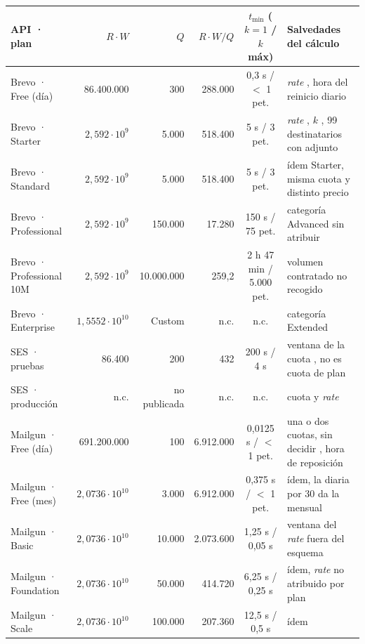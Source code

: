 \begin{table}[H]
\centering
\scriptsize
\setlength{\tabcolsep}{2.3pt}
\begin{tabular}{|l|r|r|r|c|p{2.7cm}|}
\hline
\textbf{API · plan} & \textbf{$R \cdot W$} & \textbf{$Q$} & \textbf{$R \cdot W / Q$} & \textbf{$t_{\min}$ ($k{=}1$ / $k$ máx)} & \textbf{Salvedades del cálculo} \\
\hline
Brevo · Free (día) & 86.400.000 & 300 & 288.000 & 0,3 s / $<$ 1 pet. & \textit{rate} \semambar{}, hora del reinicio diario \semrojo{} \\
\hline
Brevo · Starter & $2{,}592 \cdot 10^{9}$ & 5.000 & 518.400 & 5 s / 3 pet. & \textit{rate} \semambar{}, $k$ \semambar{}, 99 destinatarios con adjunto \\
\hline
Brevo · Standard & $2{,}592 \cdot 10^{9}$ & 5.000 & 518.400 & 5 s / 3 pet. & ídem Starter, misma cuota y distinto precio \\
\hline
Brevo · Professional & $2{,}592 \cdot 10^{9}$ & 150.000 & 17.280 & 150 s / 75 pet. & categoría Advanced sin atribuir \semambar{} \\
\hline
Brevo · Professional 10M & $2{,}592 \cdot 10^{9}$ & 10.000.000 & 259,2 & 2 h 47 min / 5.000 pet. & volumen contratado no recogido \\
\hline
Brevo · Enterprise & $1{,}5552 \cdot 10^{10}$ & Custom & n.c. & n.c. & categoría Extended \semambar{} \\
\hline
SES · pruebas & 86.400 & 200 & 432 & 200 s / 4 s & ventana de la cuota \semrojo{}, no es cuota de plan \\
\hline
SES · producción & n.c. & no publicada & n.c. & n.c. & cuota \semrojo{} y \textit{rate} \semrojo{} \\
\hline
Mailgun · Free (día) & 691.200.000 & 100 & 6.912.000 & 0,0125 s / $<$ 1 pet. & una o dos cuotas, sin decidir \semambar{}, hora de reposición \semrojo{} \\
\hline
Mailgun · Free (mes) & $2{,}0736 \cdot 10^{10}$ & 3.000 & 6.912.000 & 0,375 s / $<$ 1 pet. & ídem, la diaria por 30 da la mensual \\
\hline
Mailgun · Basic & $2{,}0736 \cdot 10^{10}$ & 10.000 & 2.073.600 & 1,25 s / 0,05 s & ventana del \textit{rate} fuera del esquema \semambar{} \\
\hline
Mailgun · Foundation & $2{,}0736 \cdot 10^{10}$ & 50.000 & 414.720 & 6,25 s / 0,25 s & ídem, \textit{rate} no atribuido por plan \semambar{} \\
\hline
Mailgun · Scale & $2{,}0736 \cdot 10^{10}$ & 100.000 & 207.360 & 12,5 s / 0,5 s & ídem \\

\end{tabular}
\end{table}
